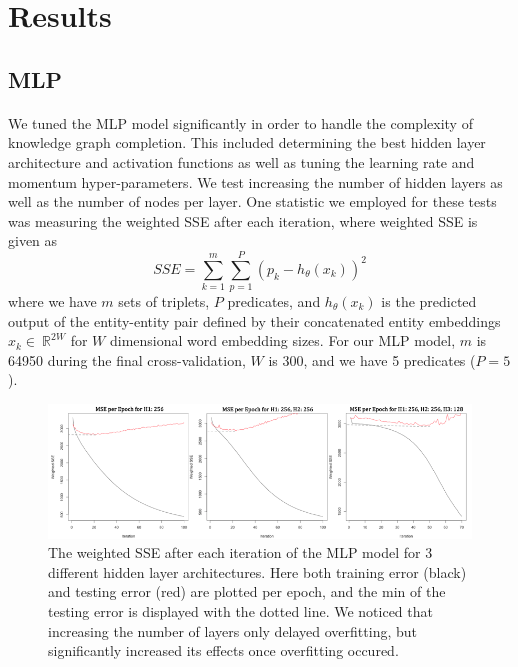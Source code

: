 \documentclass[11.5pt]{article}
\newcommand{\R}{\ \mathbb{R}}
\newcounter{graphics}
\begin{document}
\section{Results}
\subsection{MLP}

\paragraph{} We tuned the MLP model significantly in order to handle the complexity of knowledge graph completion. This included determining the best hidden layer architecture and activation functions as well as tuning the learning rate and momentum hyper-parameters.  We test increasing the number of hidden layers as well as the number of nodes per layer.  One statistic we employed for these tests was measuring the weighted SSE after each iteration, where weighted SSE is given as 
$$ SSE = \sum_{k=1}^m \sum_{p=1}^P (p_k - h_\theta(x_k))^2 $$
where we have $m$ sets of triplets, $P$ predicates, and $h_\theta(x_k)$ is the predicted output of the entity-entity pair defined by their concatenated entity embeddings $x_k\in \R^{2 W}$ for $W$ dimensional word embedding sizes. For our MLP model, $m$ is 64950 during the final cross-validation, $W$ is 300, and we have 5 predicates ($P=5$). 

\begin{figure}[h!]
\centerline{\includegraphics[width=1\textwidth]{report_mlp/MSEperEpochMLP.png}}
  \caption{\small  The weighted SSE after each iteration of the MLP model for 3 different hidden layer architectures. Here both training error (black) and testing error (red) are plotted per epoch, and the min of the testing error is displayed with the dotted line. We noticed that increasing the number of layers only delayed overfitting, but significantly increased its effects once overfitting occured.  }
\label{MSEperEpochMLP}
\end{figure}
 
\end{document}

